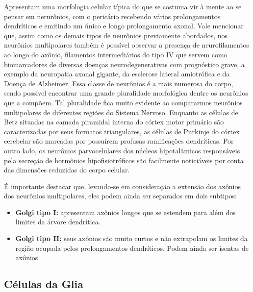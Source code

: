 \documentclass[
]{book}
\providecommand{\tightlist}{%
  \setlength{\itemsep}{0pt}\setlength{\parskip}{0pt}}
\theoremstyle{definition}
\theoremstyle{definition}
\theoremstyle{definition}
\theoremstyle{definition}
\theoremstyle{remark}
\begin{document}
Apresentam uma morfologia celular típica do que se costuma vir à mente ao se pensar em nerurônios, com o pericário recebendo vários prolongamentos dendríticos e emitindo um único e longo prolongamento axonal. Vale mencionar que, assim como os demais tipos de neurônios previamente abordados, nos neurônios multipolares também é possível observar a presença de neurofilamentos ao longo do axônio, filamentos intermediários do tipo IV que servem como biomarcadores de diversas doenças neurodegenerativas com prognóstico grave, a exemplo da neuropatia axonal gigante, da esclerose lateral amiotrófica e da Doença de Alzheimer. Essa classe de neurônios é a mais numerosa do corpo, sendo possível encontrar uma grande pluralidade morfológica dentre os neurônios que a compõem. Tal pluralidade fica muito evidente ao compararmos neurônios multipolares de diferentes regiões do Sistema Nervoso. Enquanto as células de Betz situadas na camada piramidal interna do córtex motor primário são caracterizadas por seus formatos triangulares, as células de Purkinje do córtex cerebelar são marcadas por possuírem profusas ramificações dendríticas. Por outro lado, os neurônios parvocelulares dos núcleos hipotalâmicos responsáveis pela secreção de hormônios hipofisiotróficos são facilmente noticiáveis por conta das dimensões reduzidas do corpo celular.

É importante destacar que, levando-se em consideração a extensão dos axônios dos neurônios multipolares, eles podem ainda ser separados em dois subtipos:

\begin{itemize}
\tightlist
\item
  \textbf{Golgi tipo I:} apresentam axônios longos que se estendem para além dos limites da árvore dendrítica.
\item
  \textbf{Golgi tipo II:} seus axônios são muito curtos e não extrapolam os limites da região ocupada pelos prolongamentos dendríticos. Podem ainda ser isentas de axônios.
\end{itemize}

\hypertarget{cuxe9lulas-da-glia}{%
\subsection*{Células da Glia}\label{cuxe9lulas-da-glia}}
\end{document}
